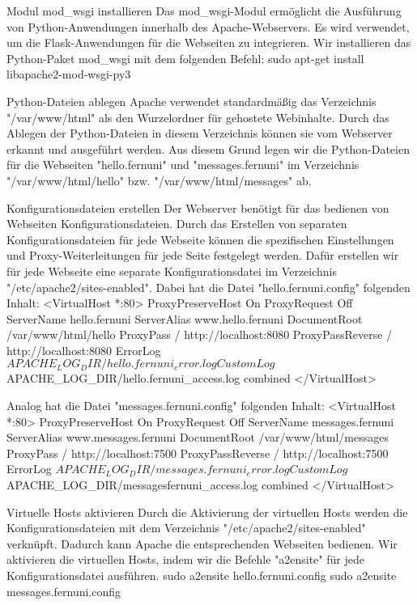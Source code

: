Modul mod_wsgi installieren
Das mod_wsgi-Modul ermöglicht die Ausführung von Python-Anwendungen innerhalb des Apache-Webservers. Es wird verwendet, um die Flask-Anwendungen für die Webseiten zu integrieren.
Wir installieren das Python-Paket mod_wsgi mit dem folgenden Befehl:
sudo apt-get install libapache2-mod-wsgi-py3


Python-Dateien ablegen
Apache verwendet standardmäßig das Verzeichnis "/var/www/html" als den Wurzelordner für gehostete Webinhalte. Durch das Ablegen der Python-Dateien in diesem Verzeichnis können sie vom Webserver erkannt und ausgeführt werden.
Aus diesem Grund legen wir die Python-Dateien für die Webseiten "hello.fernuni" und "messages.fernuni" im Verzeichnis "/var/www/html/hello"  bzw. "/var/www/html/messages" ab. 

Konfigurationsdateien erstellen
Der Webserver benötigt für das bedienen von Webseiten Konfigurationsdateien.
Durch das Erstellen von separaten Konfigurationsdateien für jede Webseite können die spezifischen Einstellungen und Proxy-Weiterleitungen für jede Seite festgelegt werden.
Dafür erstellen wir für jede Webseite eine separate Konfigurationsdatei im Verzeichnis "/etc/apache2/sites-enabled". 
Dabei hat die Datei "hello.fernuni.config" folgenden Inhalt:
<VirtualHost *:80> 
    ProxyPreserveHost On
    ProxyRequest Off
    ServerName hello.fernuni 
    ServerAlias www.hello.fernuni 
    DocumentRoot /var/www/html/hello
    ProxyPass / http://localhost:8080
    ProxyPassReverse / http://localhost:8080
    ErrorLog ${APACHE_LOG_DIR}/hello.fernuni_error.log
    CustomLog ${APACHE_LOG_DIR}/hello.fernuni_access.log combined
</VirtualHost>

Analog hat die Datei "messages.fernuni.config" folgenden Inhalt:
<VirtualHost *:80> 
    ProxyPreserveHost On
    ProxyRequest Off
    ServerName messages.fernuni 
    ServerAlias www.messages.fernuni 
    DocumentRoot /var/www/html/messages
    ProxyPass / http://localhost:7500
    ProxyPassReverse / http://localhost:7500
    ErrorLog ${APACHE_LOG_DIR}/messages.fernuni_error.log
    CustomLog ${APACHE_LOG_DIR}/messagesfernuni_access.log combined
</VirtualHost>

Virtuelle Hosts aktivieren
Durch die Aktivierung der virtuellen Hosts werden die Konfigurationsdateien mit dem Verzeichnis "/etc/apache2/sites-enabled" verknüpft. Dadurch kann Apache die entsprechenden Webseiten bedienen.
Wir aktivieren die virtuellen Hosts, indem wir die Befehle "a2ensite" für jede Konfigurationsdatei ausführen.
sudo a2ensite hello.fernuni.config
sudo a2ensite messages.fernuni.config


